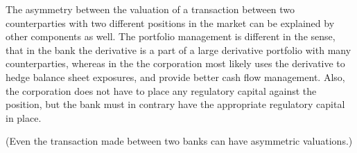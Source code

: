 \documentclass[../../../main.tex]{subfiles}
\begin{document}
        The asymmetry between the valuation of a transaction between two counterparties with two different positions in the market can be explained by other components as well.
        The portfolio management is different in the sense,
        that in the bank the derivative is a part of a large derivative portfolio with many counterparties,
        whereas in the the corporation most likely uses the derivative to hedge balance sheet exposures,
        and provide better cash flow management.
        Also, the corporation does not have to place any regulatory capital against the position,
        but the bank must in contrary have the appropriate regulatory capital in place.

        (Even the transaction made between two banks can have asymmetric valuations.)
\end{document}
